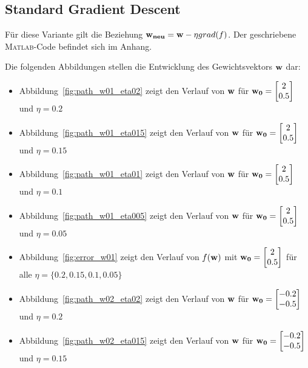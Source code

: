 \subsection{Standard Gradient Descent}

Für diese Variante gilt die Beziehung $ \mathbf{w_{neu}} = \mathbf{w} - \eta grad(f) $. Der geschriebene \textsc{Matlab}-Code befindet sich im Anhang.

Die folgenden Abbildungen stellen die Entwicklung des Gewichtsvektors $\mathbf{w}$ dar:

\begin{itemize}
  \item Abbildung~\ref{fig:path_w01_eta02} zeigt den Verlauf von $\mathbf{w}$ für $\mathbf{w_0} = \begin{bmatrix} 2 \\ 0.5 \end{bmatrix}$ und $\eta = 0.2$
  \item Abbildung~\ref{fig:path_w01_eta015} zeigt den Verlauf von $\mathbf{w}$ für $\mathbf{w_0} = \begin{bmatrix} 2 \\ 0.5 \end{bmatrix}$ und $\eta = 0.15$
  \item Abbildung~\ref{fig:path_w01_eta01} zeigt den Verlauf von $\mathbf{w}$ für $\mathbf{w_0} = \begin{bmatrix} 2 \\ 0.5 \end{bmatrix}$ und $\eta = 0.1$
  \item Abbildung~\ref{fig:path_w01_eta005} zeigt den Verlauf von $\mathbf{w}$ für $\mathbf{w_0} = \begin{bmatrix} 2 \\ 0.5 \end{bmatrix}$ und $\eta = 0.05$
  \item Abbildung~\ref{fig:error_w01} zeigt den Verlauf von $f(\mathbf{w})$ mit $\mathbf{w_0} = \begin{bmatrix} 2 \\ 0.5 \end{bmatrix}$ für alle $\eta = \{0.2, 0.15, 0.1, 0.05\}$
  \item Abbildung~\ref{fig:path_w02_eta02} zeigt den Verlauf von $\mathbf{w}$ für $\mathbf{w_0} = \begin{bmatrix} -0.2 \\ -0.5 \end{bmatrix}$ und $\eta = 0.2$
  \item Abbildung~\ref{fig:path_w02_eta015} zeigt den Verlauf von $\mathbf{w}$ für $\mathbf{w_0} = \begin{bmatrix} -0.2 \\ -0.5 \end{bmatrix}$ und $\eta = 0.15$

\end{itemize}
